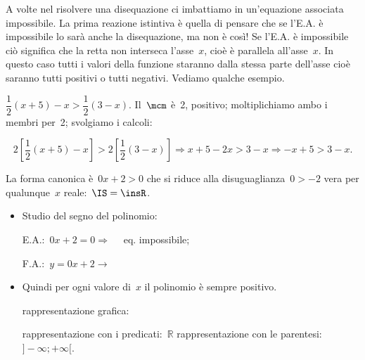 A volte nel risolvere una disequazione ci imbattiamo in un'equazione associata 
impossibile. La prima reazione istintiva è quella di pensare che se l'E.A. è 
impossibile lo sarà anche la disequazione, ma non è così! 
Se l'E.A. è impossibile ciò significa che la retta non interseca l'asse~$x$, 
cioè è parallela all'asse~$x$. In questo caso tutti i valori della funzione 
staranno dalla stessa parte dell'asse cioè saranno tutti positivi o tutti 
negativi. Vediamo qualche esempio.


\begin{esempio}
$\dfrac{1}{2} (x+5)-x>\dfrac{1}{2} (3-x).$
Il~$\mcm$ è~2, positivo; moltiplichiamo ambo i membri per~2; svolgiamo
i calcoli:

\[2 \left[\frac{1}{2}(x+5)-x\right]>2
\left[\frac{1}{2}(3-x)\right]\Rightarrow x+5-2x>3-x\Rightarrow -x+5>3-x.\]

La forma canonica è~$0 x + 2 > 0$ che si riduce alla disuguaglianza~$0>-2$
vera per qualunque~$x$ reale:~$\IS=\insR$.
\begin{itemize} [noitemsep]
 \item Studio del segno del polinomio:\\
 \begin{minipage}{.45\textwidth}
  E.A.:~$0 x + 2 = 0  \Rightarrow \quad $ eq. impossibile;
 \end{minipage}
 \begin{minipage}{.25\textwidth}
  F.A.:~$y=0 x + 2 \rightarrow $
 \end{minipage}
 \begin{minipage}{.3\textwidth}
  
 \end{minipage}
 \item Quindi per ogni valore di~$x$ il polinomio è sempre positivo. 
 \subitem 
  \begin{minipage}{.35\textwidth}
   rappresentazione grafica: 
  \end{minipage}
  \begin{minipage}{.30\textwidth}
   
  \end{minipage}
 \subitem rappresentazione con i predicati:~$\mathbb{R}$ 
 \subitem rappresentazione con le parentesi:~$]-\infty; +\infty[$. 
\end{itemize}
\end{esempio}


